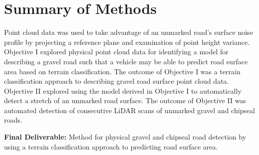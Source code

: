 \documentclass[numbered,pdftex]{ohio-etd}
\begin{document}
	\section{Summary of Methods}\label{sec:summary-of-methods}
	{
		
		{Point cloud data was used to take advantage of an unmarked road's surface noise profile by projecting a reference plane and examination of point height variance. Objective I explored physical point cloud data for identifying a model for describing a gravel road such that a vehicle may be able to predict road surface area based on terrain classification. The outcome of Objective I was a terrain classification approach to describing gravel road surface point cloud data. Objective II explored using the model derived in Objective I to automatically detect a stretch of an unmarked road surface. The outcome of Objective II was automated detection of consecutive LiDAR scans of unmarked gravel and chipseal roads.}
		 
		{\textbf{Final Deliverable:} Method for physical gravel and chipseal road detection by using a terrain classification approach to predicting road surface area.}
		
	} %
\end{document}
